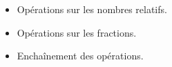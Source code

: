 \begin{prerequis}[Prérequis]    
    \begin{itemize}
        \item Opérations sur les nombres relatifs.
        \item Opérations sur les fractions.
        \item Enchaînement des opérations.        
    \end{itemize}
\end{prerequis}
